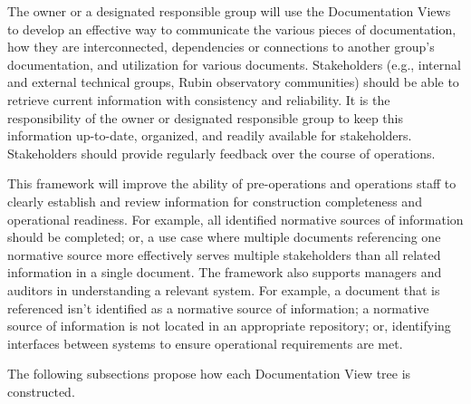 The owner or a designated responsible group will use the Documentation Views to develop an effective way to communicate the various pieces of documentation, how they are interconnected, dependencies or connections to another group's documentation, and utilization for various documents.
Stakeholders (e.g., internal and external technical groups, Rubin observatory communities) should be able to retrieve current information with consistency and reliability.
It is the responsibility of the owner or designated responsible group to keep this information up-to-date, organized, and readily available for stakeholders.
Stakeholders should provide regularly feedback over the course of operations.

This framework will improve the ability of pre-operations and operations staff to clearly establish and review information for construction completeness and operational readiness.
For example, all identified normative sources of information should be completed; or, a use case where multiple documents referencing one normative source more effectively serves multiple stakeholders than all related information in a single document.
The framework also supports managers and auditors in understanding a relevant system.
For example, a document that is referenced isn't identified as a normative source of information; a normative source of information is not located in an appropriate repository; or, identifying interfaces between systems to ensure operational requirements are met.

The following subsections propose how each Documentation View tree is constructed.
